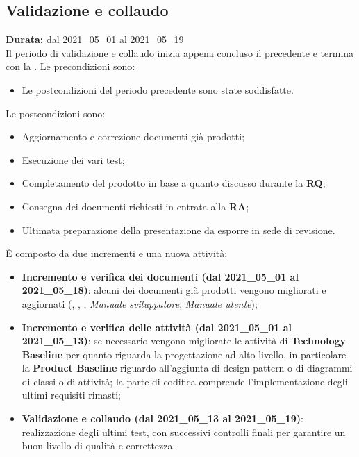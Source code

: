 \subsection{Validazione e collaudo}
\label{validazione_e_collaudo}
\textbf{Durata:} dal 2021\_05\_01 al 2021\_05\_19\\
Il periodo di validazione e collaudo inizia appena concluso il precedente e termina con la .
Le precondizioni sono:
\begin{itemize}
    \item Le postcondizioni del periodo precedente sono state soddisfatte.
\end{itemize}
Le postcondizioni sono:
\begin{itemize}
    \item Aggiornamento e correzione documenti già prodotti;
    \item Esecuzione dei vari test;
    \item Completamento del prodotto in base a quanto discusso durante la \textbf{RQ};
    \item Consegna dei documenti richiesti in entrata alla \textbf{RA};
    \item Ultimata preparazione della presentazione da esporre in sede di revisione.
\end{itemize}
È composto da due incrementi e una nuova attività:
\begin{itemize}
    \item \textbf{Incremento e verifica dei documenti (dal 2021\_05\_01 al 2021\_05\_18)}: alcuni dei documenti già prodotti vengono migliorati e aggiornati ({\NdP}, {\PdP}, {\PdQ}, \textit{Manuale sviluppatore}, \textit{Manuale utente}); 
    \item \textbf{Incremento e verifica delle attività (dal 2021\_05\_01 al 2021\_05\_13)}: se necessario vengono migliorate le attività di \textbf{Technology Baseline} per quanto riguarda la progettazione ad alto livello, in particolare la \textbf{Product Baseline} riguardo all'aggiunta di design pattern o di diagrammi di classi o di attività; la parte di codifica comprende l'implementazione degli ultimi requisiti rimasti;
    \item \textbf{Validazione e collaudo (dal 2021\_05\_13 al 2021\_05\_19)}: realizzazione degli ultimi test, con successivi controlli finali per garantire un buon livello di qualità e correttezza.
\end{itemize}
